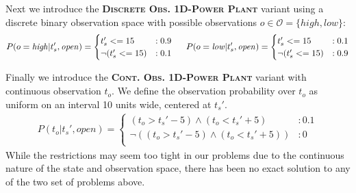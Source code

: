 \documentclass{article} %
\newcommand{\open}{\mathit{open}}
\newcommand{\close}{\mathit{close}}
\newcommand{\high}{\mathit{high}}
\newcommand{\low}{\mathit{low}}
\begin{document}
Next we introduce the \textsc{\bf Discrete Obs. 1D-Power Plant} variant using 
a discrete binary observation space with possible
observations $o \in \mathcal{O} = \{\high,\low\}$:
{\footnotesize
\vspace{-1mm}
\begin{align}
P(o=\high|t_s',\open) = 
\begin{cases}
  t_s' <= 15 &: 0.9 \\
 \neg (t_s' <= 15)&: 0.1 \\
\end{cases}
\hspace{5mm}
P(o=\low|t_s',\open) = 
\begin{cases}
 t_s' <= 15 &: 0.1 \\
 \neg (t_s' <= 15) &: 0.9 \\
\end{cases}
\end{align}
\vspace{-3mm}
}

Finally we introduce the \textsc{\bf Cont. Obs. 1D-Power Plant}
variant with continuous observation $t_o$.  
We define the observation probability over $t_o$ as uniform on
an interval 10 units wide, centered at $t_s'$.
{\footnotesize
\begin{align}
P(t_o|t_s',\open) = 
\begin{cases}
 (t_o>t_s'-5) \wedge (t_o<t_s'+5) &: 0.1 \\
 \neg((t_o>t_s'-5) \wedge (t_o<t_s'+5)) &: 0 \\
\end{cases}
\end{align}
}
While the restrictions may seem too tight in our problems due to the continuous nature of the state and observation space, there has been no exact solution to any of the two set of problems above. 
\end{document}
